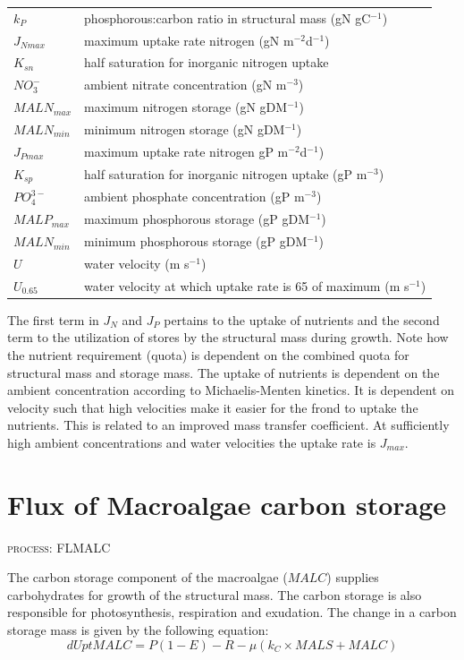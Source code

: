 \documentclass{deltares_manual}
\begin{document}
\begin{tabular}{ll}
$k_P$        & phosphorous:carbon ratio in structural mass (gN gC$^{-1}$)\\
$J_{Nmax}$   & maximum uptake rate nitrogen (gN m$^{-2}$d$^{-1}$)\\
$K_{sn}$     & half saturation for inorganic nitrogen uptake\\
$NO_3^-$     & ambient nitrate concentration (gN m$^{-3}$)\\
$MALN_{max}$ & maximum nitrogen storage (gN gDM$^{-1}$)\\
$MALN_{min}$ & minimum nitrogen storage (gN gDM$^{-1}$)\\
$J_{Pmax}$   & maximum uptake rate nitrogen gP m$^{-2}$d$^{-1}$)\\
$K_{sp}$     & half saturation for inorganic nitrogen uptake (gP m$^{-3}$)\\
$PO_4^{3-}$  & ambient phosphate concentration (gP m$^{-3}$)\\
$MALP_{max}$ & maximum phosphorous storage (gP gDM$^{-1}$)\\
$MALN_{min}$ & minimum phosphorous storage (gP gDM$^{-1}$)\\
$U$          & water velocity (m s$^{-1}$)\\
$U_{0.65}$   & water velocity at which uptake rate is 65 of maximum (m s$^{-1}$)\\
\end{tabular}

The first term in $J_{N}$ and $J_{P}$ pertains to the uptake of nutrients and the second term to the utilization of stores by the structural mass during growth. Note how the nutrient requirement (quota) is dependent on the combined quota for structural mass and storage mass. The uptake of nutrients is dependent on the ambient concentration according to Michaelis-Menten kinetics. It is dependent on velocity such that high velocities make it easier for the frond to uptake the nutrients. This is related to an improved mass transfer coefficient. At sufficiently high ambient concentrations and water velocities the uptake rate is $J_{max}$.
\pagebreak

\section{Flux of Macroalgae carbon storage}
\begin{flushright}
\textsc{process: FLMALC}
\end{flushright}

The carbon storage component of the macroalgae ($MALC$) supplies carbohydrates for growth of the structural mass. The carbon storage is also responsible for photosynthesis, respiration and exudation. The change in a carbon storage mass is given by the following equation:
\begin{equation}
dUptMALC = P(1-E)-R - \mu(k_C \times MALS + MALC)
\end{equation}
\end{document}
